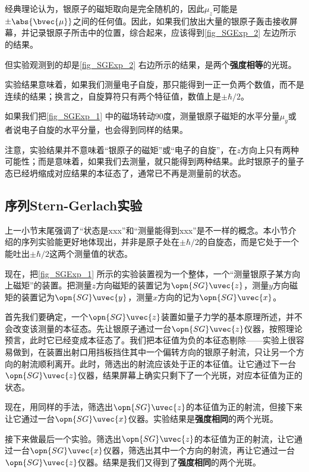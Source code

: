 经典理论认为，银原子的磁矩取向是完全随机的，因此$\mu_z$可能是$\pm\abs{\bvec{\mu}}$之间的任何值。因此，如果我们放出大量的银原子轰击接收屏幕，并记录银原子所击中的位置，综合起来，应该得到\autoref{fig_SGExp_2} 左边所示的结果。

但实验观测到的却是\autoref{fig_SGExp_2} 右边所示的结果，是两个\textbf{强度相等}的光斑。


实验结果意味着，如果我们测量电子自旋，那只能得到一正一负两个数值，而不是连续的结果；换言之，自旋算符只有两个特征值，数值上是$\pm\hbar/2$。


如果我们把\autoref{fig_SGExp_1} 中的磁场转动90度，测量银原子磁矩的水平分量$\mu_y$或者说电子自旋的水平分量，也会得到同样的结果。



注意，实验结果并不意味着“银原子的磁矩”或“电子的自旋”，在$z$方向上只有两种可能性；而是意味着，如果我们去测量，就只能得到两种结果。此时银原子的量子态已经坍缩成对应结果的本征态了，通常已不再是测量前的状态。



\subsection{序列Stern-Gerlach实验}\label{sub_SGExp_1}

上一小节末尾强调了“状态是xxx”和“测量能得到xxx”是不一样的概念。本小节介绍的序列实验能更好地体现出，并非是原子处在$\pm\hbar/2$的自旋态，而是它处于一个能吐出$\pm\hbar/2$这两个测量值的状态。

现在，把\autoref{fig_SGExp_1} 所示的实验装置视为一个整体，一个“测量银原子某方向上磁矩”的装置。把测量$z$方向磁矩的装置记为$\opn{SG}\uvec{z}$，测量$y$方向磁矩的装置记为$\opn{SG}\uvec{y}$，测量$x$方向的记为$\opn{SG}\uvec{x}$。

首先我们要确定，一个$\opn{SG}\uvec{z}$装置如量子力学的基本原理所述，并不会改变该测量的本征态。先让银原子通过一台$\opn{SG}\uvec{z}$仪器，按照理论预言，此时它已经变成本征态了。我们把本征值为负的本征态剔除——实验上很容易做到，在装置出射口用挡板挡住其中一个偏转方向的银原子射流，只让另一个方向的射流顺利离开。此时，筛选出的射流应该处于正的本征值。让它通过下一台$\opn{SG}\uvec{z}$仪器，结果屏幕上确实只剩下了一个光斑，对应本征值为正的状态。

现在，用同样的手法，筛选出$\opn{SG}\uvec{z}$的本征值为正的射流，但接下来让它通过一台$\opn{SG}\uvec{x}$仪器。实验结果是\textbf{强度相同}的两个光斑。

接下来做最后一个实验。筛选出$\opn{SG}\uvec{z}$的本征值为正的射流，让它通过一台$\opn{SG}\uvec{x}$仪器，筛选出其中一个方向的射流，再让它通过一台$\opn{SG}\uvec{z}$仪器。结果是我们又得到了\textbf{强度相同}的两个光斑。



